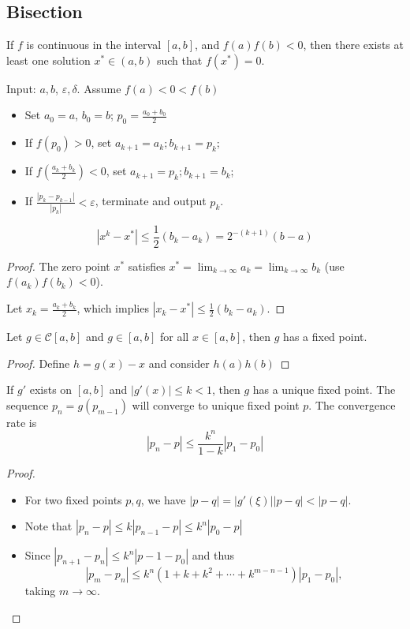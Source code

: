 \subsection{Bisection}
\begin{theorem}
If $f$ is continuous in the interval $[a,b]$, and $f(a)f(b)<0$, then there exists at least one solution $x^*\in(a,b)$ such that $f(x^*)=0$.
\end{theorem}
\begin{example}
Input: $a,b$, $\varepsilon,\delta$. Assume $f(a)<0<f(b)$
\begin{itemize}
\item
Set $a_0=a$, $b_0=b$; $p_0=\frac{a_0+b_0}{2}$
\item
If $f(p_0)>0$, set $a_{k+1}=a_k;b_{k+1}=p_k$;
\item
If $f(\frac{a_k+b_k}{2})<0$, set $a_{k+1}=p_k;b_{k+1}=b_k$;
\item
If $\frac{|p_k-p_{k-1}|}{|p_k|}<\varepsilon$, terminate and output $p_k$.
\end{itemize}
\end{example}
\begin{theorem}
\[
|x^k-x^*|\le\frac{1}{2}(b_k-a_k)=2^{-(k+1)}(b-a)
\]
\end{theorem}
\begin{proof}
The zero point $x^*$ satisfies $x^*=\lim_{k\to\infty}a_k=\lim_{k\to\infty}b_k$ (use $f(a_k)f(b_k)<0$).

Let $x_k=\frac{a_k+b_k}{2}$, which implies $|x_k-x^*|\le\frac{1}{2}(b_k-a_k)$.
\end{proof}
\begin{theorem}
Let $g\in\mathcal{C}[a,b]$ and $g\in[a,b]$ for all $x\in[a,b]$, then $g$ has a fixed point.
\end{theorem}
\begin{proof}
Define $h=g(x)-x$ and consider $h(a)h(b)$
\end{proof}
\begin{theorem}[Uniqueness]
If $g'$ exists on $[a,b]$ and $|g'(x)|\le k<1$, then $g$ has a unique fixed point. The sequence $p_n=g(p_{m-1})$ will converge to unique fixed point $p$. The convergence rate is
\[
|p_n-p|\le\frac{k^n}{1-k}|p_1-p_0|
\]
\end{theorem}
\begin{proof}
\begin{itemize}
\item
For two fixed points $p,q$, we have $|p-q|=|g'(\xi)||p-q|<|p-q|$.
\item
Note that $|p_n-p|\le k|p_{n-1}-p|\le k^n|p_0-p|$
\item
Since $|p_{n+1}-p_n|\le k^n|p-1-p_0|$ and thus 
\[
|p_m-p_n|\le k^n(1+k+k^2+\cdots+k^{m-n-1})|p_1-p_0|,
\]
taking $m\to\infty$.
\end{itemize}
\end{proof}
